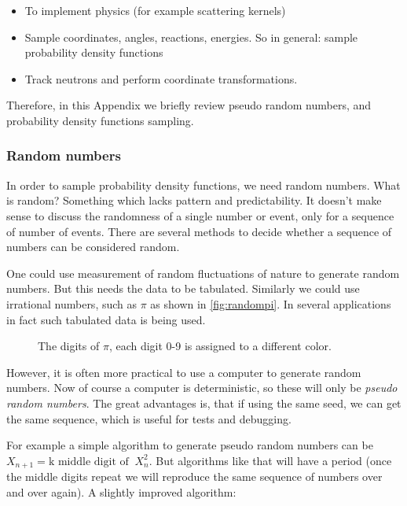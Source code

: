 \begin{itemize}
\item To implement physics (for example scattering kernels)
\item Sample coordinates, angles, reactions, energies. So in general: sample probability density functions
\item Track neutrons and perform coordinate transformations.
\end{itemize}


Therefore, in this Appendix we briefly review pseudo random numbers, and  probability density functions sampling.

\subsubsection{Random numbers}

In order to sample probability density functions, we need random numbers. What is random? Something which lacks pattern and predictability. It doesn't make sense to discuss the randomness of a single number or event, only for a sequence of number of events. There are several methods to decide whether a sequence of numbers can be considered random.

One could use measurement of random fluctuations of nature to generate random numbers. But this needs the data to be tabulated. Similarly we could use irrational numbers, such as $\pi$ as shown in \autoref{fig:randompi}. In several applications in fact such tabulated data is being used.

\begin{figure}[ht!]
\protect {}\protect
\caption{\label{fig:randompi} \footnotesize{The digits of $\pi$, each digit 0-9 is assigned to a different color.}}
\end{figure}


However, it is often more practical to use a computer to generate random numbers. Now of course a computer is deterministic, so these will only be \textit{pseudo random numbers}. The great advantages is, that if using the same seed, we can get the same sequence, which is useful for tests and debugging. 

For example a simple algorithm to generate pseudo random numbers can be $X_{n+1}=\text{k middle digit of }\: X_n^2$. But algorithms like that will have a period (once the middle digits repeat we will reproduce the same sequence of numbers over and over again). A slightly improved algorithm:

